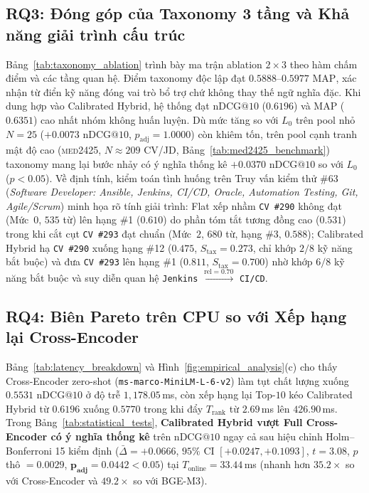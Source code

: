 \subsection{RQ3: Đóng góp của Taxonomy 3 tầng và Khả năng giải trình cấu trúc}
\label{sec:rq3}
Bảng~\ref{tab:taxonomy_ablation} trình bày ma trận ablation $2\times 3$ theo hàm chấm điểm và các tầng quan hệ. Điểm taxonomy độc lập đạt $0.5888$--$0.5977$ $\text{MAP}$, xác nhận từ điển kỹ năng đóng vai trò bổ trợ chứ không thay thế ngữ nghĩa đặc. Khi dung hợp vào Calibrated Hybrid, hệ thống đạt $\text{nDCG}@10$ ($0.6196$) và $\text{MAP}$ ($0.6351$) cao nhất nhóm không huấn luyện. Dù mức tăng so với $L_0$ trên pool nhỏ $N=25$ ($+0.0073$ $\text{nDCG}@10$, $p_{\text{adj}}=1.0000$) còn khiêm tốn, trên pool cạnh tranh mật độ cao (\textsc{med2425}, $N\approx 209$ CV/JD, Bảng~\ref{tab:med2425_benchmark}) taxonomy mang lại bước nhảy có ý nghĩa thống kê $+0.0370$ $\text{nDCG}@10$ so với $L_0$ ($p<0.05$). Về định tính, kiểm toán tình huống trên Truy vấn kiểm thử \#63 (\textit{Software Developer: Ansible, Jenkins, CI/CD, Oracle, Automation Testing, Git, Agile/Scrum}) minh họa rõ tính giải trình: Flat xếp nhầm \texttt{CV \#290} không đạt (Mức~$0$, $535$ từ) lên hạng \#1 ($0.610$) do phần tóm tắt tương đồng cao ($0.531$) trong khi cắt cụt \texttt{CV \#293} đạt chuẩn (Mức~$2$, $680$ từ, hạng \#3, $0.588$); Calibrated Hybrid hạ \texttt{CV \#290} xuống hạng \#12 ($0.475$, $S_{\text{tax}}=0.273$, chỉ khớp $2/8$ kỹ năng bắt buộc) và đưa \texttt{CV \#293} lên hạng \#1 ($0.811$, $S_{\text{tax}}=0.700$) nhờ khớp $6/8$ kỹ năng bắt buộc và suy diễn quan hệ \texttt{Jenkins} $\xrightarrow{\text{rel}=0.70}$ \texttt{CI/CD}.



\subsection{RQ4: Biên Pareto trên CPU so với Xếp hạng lại Cross-Encoder}
\label{sec:rq4}
Bảng~\ref{tab:latency_breakdown} và Hình~\ref{fig:empirical_analysis}(c) cho thấy Cross-Encoder zero-shot (\texttt{ms-marco-\allowbreak MiniLM-L-6-v2}) làm tụt chất lượng xuống $0.5531$ $\text{nDCG}@10$ ở độ trễ $1{,}178.05$\,ms, còn xếp hạng lại Top-$10$ kéo Calibrated Hybrid từ $0.6196$ xuống $0.5770$ trong khi đẩy $T_{\text{rank}}$ từ $2.69$\,ms lên $426.90$\,ms. Trong Bảng~\ref{tab:statistical_tests}, \textbf{Calibrated Hybrid vượt Full Cross-Encoder có ý nghĩa thống kê} trên $\text{nDCG}@10$ ngay cả sau hiệu chỉnh Holm--Bonferroni 15 kiểm định ($\bar{\Delta}=+0.0666$, $95\%$ CI $[+0.0247,+0.1093]$, $t=3.08$, $p$ thô $=0.0029$, $\mathbf{p_{\text{adj}}=0.0442 < 0.05}$) tại $T_{\text{online}}=33.44$\,ms (nhanh hơn $35.2\times$ so với Cross-Encoder và $49.2\times$ so với BGE-M3).

